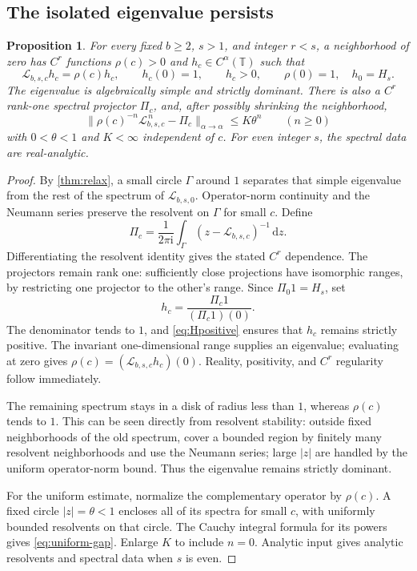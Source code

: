 \documentclass[11pt,a4paper]{article}
\numberwithin{equation}{section}
\newtheorem{proposition}[proposition]{Proposition}
\theoremstyle{definition}
\theoremstyle{remark}
\newcommand{\TT}{\mathbb T}
\newcommand{\ii}{\mathrm i}
\newcommand{\dd}{\,\mathrm d}
\newcommand{\Lop}{\mathcal L}
\newcommand{\Proj}{\Pi}
\begin{document}
\subsection{The isolated eigenvalue persists}
\begin{proposition}
\label{prop:perron}
For every fixed $b\ge2$, $s>1$, and integer $r<s$, a neighborhood of
zero has $C^r$ functions $\rho(c)>0$ and $h_c\in C^\alpha(\TT)$ such that
\begin{equation}
 \Lop_{b,s,c}h_c=\rho(c)h_c,\qquad
 h_c(0)=1,\qquad h_c>0,\qquad
 \rho(0)=1,\quad h_0=H_s.
 \label{eq:perron}
\end{equation}
The eigenvalue is algebraically simple and strictly dominant. There is
also a $C^r$ rank-one spectral projector $\Proj_c$, and, after possibly
shrinking the neighborhood,
\begin{equation}
 \|\rho(c)^{-n}\Lop_{b,s,c}^{\,n}-\Proj_c\|_{\alpha\to\alpha}
 \le K\theta^n\qquad(n\ge0)
 \label{eq:uniform-gap}
\end{equation}
with $0<\theta<1$ and $K<\infty$ independent of $c$. For even integer
$s$, the spectral data are real-analytic.
\end{proposition}
\begin{proof}
By \cref{thm:relax}, a small circle $\Gamma$ around $1$ separates that
simple eigenvalue from the rest of the spectrum of $\Lop_{b,s,0}$.
Operator-norm continuity and the Neumann series preserve the resolvent
on $\Gamma$ for small $c$. Define
\[
 \Proj_c=\frac1{2\pi\ii}\int_\Gamma
 (z-\Lop_{b,s,c})^{-1}\dd z.
\]
Differentiating the resolvent identity gives the stated $C^r$ dependence.
The projectors remain rank one: sufficiently close projections have
isomorphic ranges, by restricting one projector to the other's range.
Since $\Proj_0 1=H_s$, set
\[
 h_c=\frac{\Proj_c1}{(\Proj_c1)(0)}.
\]
The denominator tends to $1$, and \cref{eq:Hpositive} ensures that
$h_c$ remains strictly positive. The invariant one-dimensional range
supplies an eigenvalue; evaluating at zero gives
$\rho(c)=(\Lop_{b,s,c}h_c)(0)$. Reality, positivity, and $C^r$ regularity
follow immediately.

The remaining spectrum stays in a disk of radius less than $1$, whereas
$\rho(c)$ tends to $1$. This can be seen directly from resolvent stability:
outside fixed neighborhoods of the old spectrum, cover a bounded region
by finitely many resolvent neighborhoods and use the Neumann series;
large $|z|$ are handled by the uniform operator-norm bound.
Thus the eigenvalue remains strictly dominant.

For the uniform estimate, normalize the complementary operator by
$\rho(c)$. A fixed circle $|z|=\theta<1$ encloses all of its spectra for
small $c$, with uniformly bounded resolvents on that circle. The Cauchy
integral formula for its powers gives \cref{eq:uniform-gap}. Enlarge $K$
to include $n=0$. Analytic input gives analytic resolvents and spectral
data when $s$ is even.
\end{proof}
\end{document}
